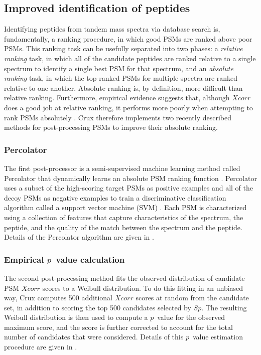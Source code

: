 \documentclass[12pt]{article}
\begin{document}
\subsection{Improved identification of peptides}

Identifying peptides from tandem mass spectra via database search is,
fundamentally, a ranking procedure, in which good PSMs are ranked
above poor PSMs.  This ranking task can be usefully separated into two
phases: a {\em relative ranking} task, in which all of the candidate
peptides are ranked relative to a single spectrum to identify a single
best PSM for that spectrum, and an {\em absolute ranking} task, in
which the top-ranked PSMs for multiple spectra are ranked relative to
one another.  Absolute ranking is, by definition, more difficult than
relative ranking.  Furthermore, empirical evidence suggests that,
although $Xcorr$ does a good job at relative ranking, it performs more
poorly when attempting to rank PSMs absolutely \cite{keller:empirical,
anderson:new}. Crux therefore implements two recently described
methods for post-processing PSMs to improve their absolute ranking.

\subsubsection{Percolator}
\label{section:percolator}

The first post-processor is a semi-supervised machine learning method
called Percolator that dynamically learns an absolute PSM ranking
function \cite{kall:semi-supervised}.  Percolator uses a subset of the
high-scoring target PSMs as positive examples and all of the decoy
PSMs as negative examples to train a discriminative classification
algorithm called a support vector machine (SVM) \cite{boser:training,
noble:what}.  Each PSM is characterized using a collection of features
that capture characteristics of the spectrum, the peptide, and the
quality of the match between the spectrum and the peptide.  Details of
the Percolator algorithm are given in \cite{kall:semi-supervised}.

\subsubsection{Empirical $p$~value calculation}

The second post-processing method fits the observed distribution of
candidate PSM $Xcorr$ scores to a Weibull distribution.  To do this
fitting in an unbiased way, Crux computes 500 additional $Xcorr$ scores
at random from the candidate set, in addition to scoring the top 500
candidates selected by $Sp$.  The resulting Weibull distribution is
then used to compute a $p$~value for the observed maximum score, and
the score is further corrected to account for the total number of
candidates that were considered.  Details of this $p$~value estimation
procedure are given in \cite{klammer:not}.
\end{document}
